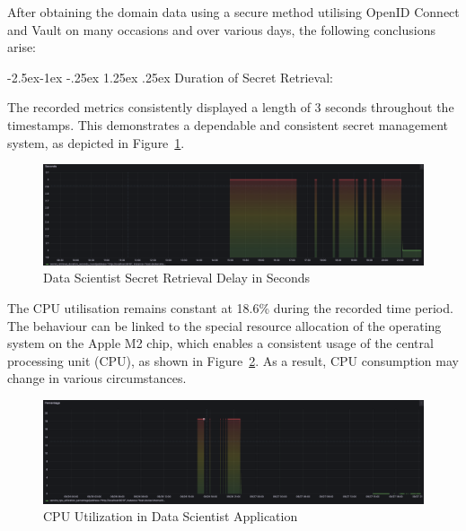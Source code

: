 \documentclass[preprint,12pt]{elsarticle}
\makeatletter
\renewcommand\paragraph{\@startsection{paragraph}{4}{\z@}%
            {-2.5ex\@plus -1ex \@minus -.25ex}%
            {1.25ex \@plus .25ex}%
            {\normalfont\normalsize\itshape}}
\makeatother
\begin{document}
After obtaining the domain data using a secure method utilising OpenID Connect and Vault on many occasions and over various days, the following conclusions arise:

\paragraph{Duration of Secret Retrieval:}

The recorded metrics consistently displayed a length of 3 seconds throughout the timestamps. This demonstrates a dependable and consistent secret management system, as depicted in Figure~\ref{dataScientistSecretRetrievalDelayInSeconds}.

\begin{figure}[ht]

  \centering

  \includegraphics[width=\textwidth]{images/Secret-Retrieval-Delay-in-Seconds-In-Data-Scientist-Application.png}

  \caption{Data Scientist Secret Retrieval Delay in Seconds }

  \label{dataScientistSecretRetrievalDelayInSeconds}

\end{figure}

The CPU utilisation remains constant at 18.6\% during the recorded time period. The behaviour can be linked to the special resource allocation of the operating system on the Apple M2 chip, which enables a consistent usage of the central processing unit (CPU), as shown in Figure~\ref{cpuUtilizationInDataScientistApplication}. As a result, CPU consumption may change in various circumstances.

\begin{figure}[ht]

  \centering

  \includegraphics[width=\textwidth]{images/CPU-utilization-data-scientist-application.png}

  \caption{CPU Utilization in Data Scientist Application}

  \label{cpuUtilizationInDataScientistApplication}

\end{figure}
\end{document}
